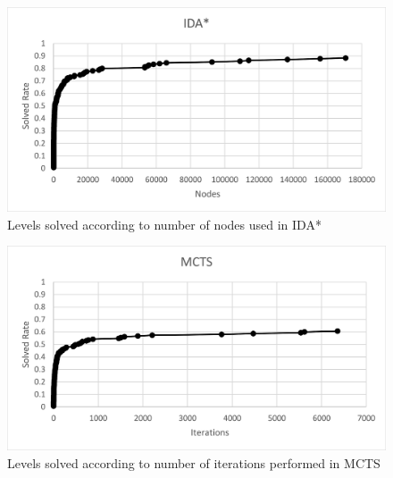 \begin{figure}[!h]
    \centering
    \includegraphics[width=0.8\linewidth]{pictures/SokobanIDAComplexity.png}
    \caption[IDA* solved levels]{Levels solved according to number of nodes used in IDA*}
    \label{fig:sokobanIDAComplexity}
\end{figure}
\clearpage

\begin{figure}[!h]
    \centering
    \includegraphics[width=0.8\linewidth]{pictures/SokobanMCTSComplexity.png}
    \caption[MCTS solved levels]{Levels solved according to number of iterations performed in MCTS}
    \label{fig:sokobanMCTSComplexity}
\end{figure}

